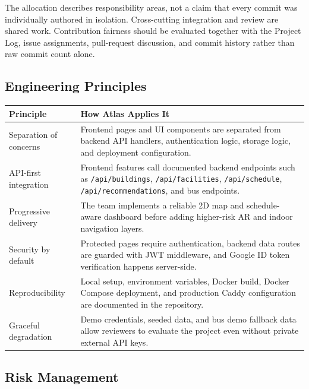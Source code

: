 \documentclass[11pt]{article}
\begin{document}
The allocation describes responsibility areas, not a claim that every commit was individually authored in isolation. Cross-cutting integration and review are shared work. Contribution fairness should be evaluated together with the Project Log, issue assignments, pull-request discussion, and commit history rather than raw commit count alone.

\subsection*{Engineering Principles}

\begin{center}
\renewcommand{\arraystretch}{1.35}
\begin{tabularx}{\textwidth}{|L{0.28\textwidth}|X|}
\hline
\textbf{Principle} & \textbf{How Atlas Applies It} \\
\hline
Separation of concerns & Frontend pages and UI components are separated from backend API handlers, authentication logic, storage logic, and deployment configuration. \\
\hline
API-first integration & Frontend features call documented backend endpoints such as \texttt{/api/buildings}, \texttt{/api/facilities}, \texttt{/api/schedule}, \texttt{/api/recommendations}, and bus endpoints. \\
\hline
Progressive delivery & The team implements a reliable 2D map and schedule-aware dashboard before adding higher-risk AR and indoor navigation layers. \\
\hline
Security by default & Protected pages require authentication, backend data routes are guarded with JWT middleware, and Google ID token verification happens server-side. \\
\hline
Reproducibility & Local setup, environment variables, Docker build, Docker Compose deployment, and production Caddy configuration are documented in the repository. \\
\hline
Graceful degradation & Demo credentials, seeded data, and bus demo fallback data allow reviewers to evaluate the project even without private external API keys. \\
\hline
\end{tabularx}
\end{center}

\subsection*{Risk Management}
\end{document}
